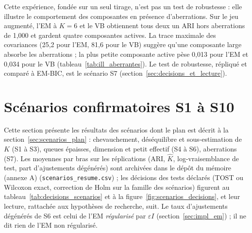 Cette expérience, fondée sur un seul tirage, n'est pas un test de robustesse : elle illustre le comportement des composantes en présence d'aberrations. Sur le jeu augmenté, l'EM à $K=6$ et le VB obtiennent tous deux un ARI hors aberrations de 1,000 et gardent quatre composantes actives. La trace maximale des covariances (25,2 pour l'EM, 81,6 pour le VB) suggère qu'une composante large absorbe les aberrations ; la plus petite composante active pèse 0,013 pour l'EM et 0,034 pour le VB (tableau~\ref{tab:ill_aberrantes}). Le test de robustesse, répliqué et comparé à EM-BIC, est le scénario S7 (section~\ref{sec:decisions_et_lecture}).

\section{Scénarios confirmatoires S1 à S10}\label{sec:res_scenarios}
Cette section présente les résultats des scénarios dont le plan est décrit à la section~\ref{sec:scenarios_plan} : chevauchement, déséquilibre et sous-estimation de $K$ (S1 à S3), queues épaisses, dimension et petit effectif (S4 à S6), aberrations (S7).\label{sec:res_s1s3}\label{sec:res_s4s6}\label{sec:res_s7} Les moyennes par bras sur les réplications (ARI, $\hat K$, log-vraisemblance de test, part d'ajustements dégénérés) sont archivées dans le dépôt du mémoire (annexe A) (\texttt{scenarios\_resume.csv}) ; les décisions des tests déclarés (TOST ou Wilcoxon exact, correction de Holm sur la famille des scénarios) figurent au tableau~\ref{tab:decisions_scenarios} et à la figure~\ref{fig:scenarios_decisions}, et leur lecture, rattachée aux hypothèses de recherche, suit. Le taux d'ajustements dégénérés de S6 est celui de l'EM \emph{régularisé} par $\varepsilon I$ (section~\ref{sec:impl_em}) ; il ne dit rien de l'EM non régularisé.

